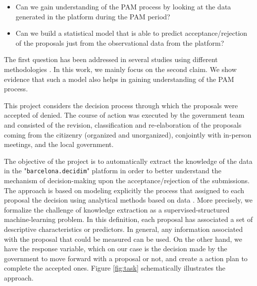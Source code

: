 \begin{itemize}
\item Can we gain understanding of the PAM process by looking at the data generated in the platform during the PAM period? 
\item Can we build a statistical model that is able to predict acceptance/rejection of the proposals just from the observational data from the platform? 
\end{itemize}

The first question has been addressed in several studies using different methodologies \cite{dcent,Aragon2017,report}. In this work, we mainly focus on the second claim. We show evidence that such a model also helps in gaining understanding of the PAM process.

This project considers the decision process through which the proposals were accepted of denied. The course of action was executed by the government team and consisted of the revision, classification and re-elaboration of the proposals coming from the citizenry (organized and unorganized), conjointly with in-person meetings, and the local government. 

The objective of the project is to automatically extract the knowledge of the data in the "\verb+barcelona.decidim+" platform in order to better understand the mechanism of decision-making upon the acceptance/rejection of the submissions. The approach  is based on modeling explicitly the process that assigned to each proposal the decision using analytical methods based on data \cite{Murphy:2012:MLP:2380985}. More precisely, we formalize the challenge of knowledge extraction as a supervised-structured machine-learning problem. In this 
definition, each proposal has associated a set of descriptive characteristics or predictors. In general, any information associated with the proposal that could be measured can be used. On the other hand, we have the response variable, which on our case is the decision made by the government to move forward with a proposal or not, and create a action plan to complete the accepted ones. 
Figure \ref{fig:task} schematically illustrates the approach.

